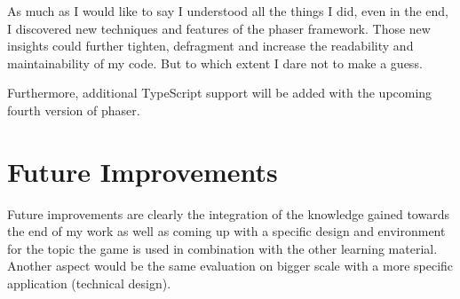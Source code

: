 As much as I would like to say I understood all the things I did, even in the end, I discovered new techniques and features of
the phaser framework. Those new insights could further tighten, defragment and increase the readability and maintainability of my code.
But to which extent I dare not to make a guess.

Furthermore, additional TypeScript support will be added with the upcoming fourth version of phaser.

\section{Future Improvements}\label{sec:future-improvements}
Future improvements are clearly the integration of the knowledge gained towards the end of my work as well as coming up
with a specific design and environment for the topic the game is used in combination with the other learning material.
Another aspect would be the same evaluation on bigger scale with a more specific application (technical design).

